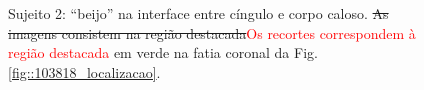  \begin{figure}[H]
\centering
    \hfill
    \caption{Sujeito 2: ``beijo'' na interface entre cíngulo e corpo caloso. \sout{As imagens consistem na região destacada}\textcolor{red}{Os recortes correspondem à região destacada} em verde na fatia coronal da Fig. \ref{fig::103818_localizacao}.
    }
    \label{fig::103818_kissing}
\end{figure}

